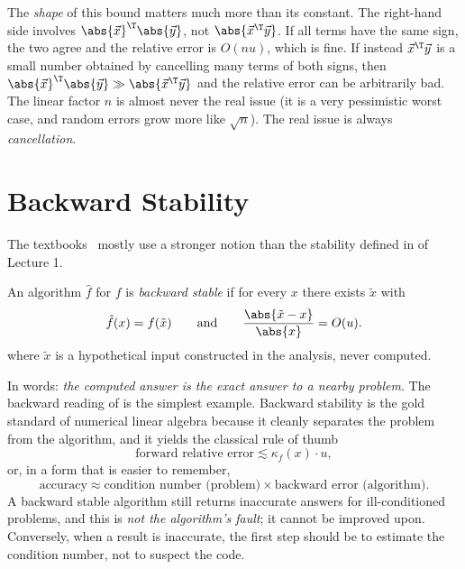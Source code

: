 The \emph{shape} of this bound matters much more than its constant. The right-hand side involves $\abs{\vec{x}}^\T\abs{\vec{y}}$, not $\abs{\vec{x}^\T\vec{y}}$. If all terms have the same sign, the two agree and the relative error is $O(nu)$, which is fine. If instead $\vec{x}^\T\vec{y}$ is a small number obtained by cancelling many terms of both signs, then $\abs{\vec{x}}^\T\abs{\vec{y}} \gg \abs{\vec{x}^\T\vec{y}}$ and the relative error can be arbitrarily bad. The linear factor $n$ is almost never the real issue (it is a very pessimistic worst case, and random errors grow more like $\sqrt{n}$). The real issue is always \emph{cancellation}.

\section{Backward Stability}
\label{sec:backward}

The textbooks~\cite[Lecture 14]{TB} mostly use a stronger notion than the stability defined in  of Lecture 1.

\begin{definition}
  \label{def:backward-stable}
  An algorithm $\hat{f}$ for $f$ is \emph{backward stable} if for every $x$ there exists $\tilde{x}$ with
  \begin{equation}
    \hat{f}(x) = f(\tilde{x}) \qquad \text{and} \qquad \frac{\abs{\tilde{x} - x}}{\abs{x}} = O(u).
  \end{equation}
  where $\tilde{x}$ is a hypothetical input constructed in the analysis, never computed.
\end{definition}

In words: \emph{the computed answer is the exact answer to a nearby problem}. The backward reading of  is the simplest example. Backward stability is the gold standard of numerical linear algebra because it cleanly separates the problem from the algorithm, and it yields the classical rule of thumb
\begin{equation}
  \text{forward relative error} \lesssim \kappa_f(x) \cdot u,
\end{equation}
or, in a form that is easier to remember,
\begin{equation}
  \text{accuracy} \approx \text{condition number (problem)} \times \text{backward error (algorithm)}.
\end{equation}
A backward stable algorithm still returns inaccurate answers for ill-conditioned problems, and this is \emph{not the algorithm's fault}; it cannot be improved upon. Conversely, when a result is inaccurate, the first step should be to estimate the condition number, not to suspect the code.

